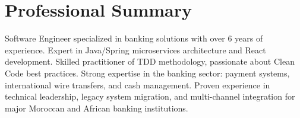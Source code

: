 \section*{Professional Summary}

Software Engineer specialized in banking solutions with over 6 years of
experience. Expert in Java/Spring microservices architecture and React development.
Skilled practitioner of TDD methodology, passionate about Clean Code best practices.
Strong expertise in the banking sector: payment systems, international wire transfers,
and cash management. Proven experience in technical leadership, legacy system
migration, and multi-channel integration for major Moroccan and African banking
institutions.
